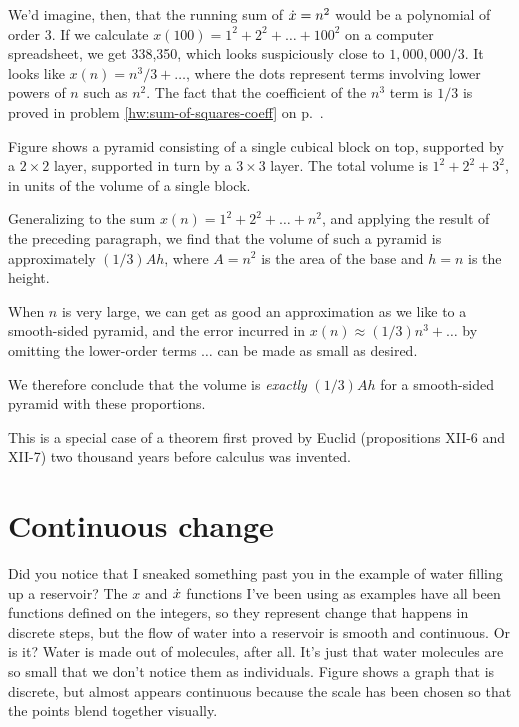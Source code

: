 We'd imagine, then, that the running sum of $\dot{x}=n^2$ would
be a polynomial of order 3. If we calculate
$x(100)=1^2+2^2+\ldots+100^2$ on a computer spreadsheet, we
get 338,350, which looks suspiciously close to $1,000,000/3$.
It looks like $x(n)=n^3/3+\ldots$, where
the dots represent terms involving lower powers of $n$
such as $n^2$. The fact that the coefficient of the $n^3$ term
is $1/3$ is proved in problem \ref{hw:sum-of-squares-coeff} on p.~\pageref{hw:sum-of-squares-coeff}.\label{claim-sum-of-squares-coeff}


\begin{eg}
Figure  shows a pyramid consisting of a single cubical block on top,
supported by a $2\times 2$ layer, supported in turn by a $3\times 3$ layer. The total
volume is $1^2+2^2+3^2$, in units of the volume of a single block. 

Generalizing to the sum $x(n)=1^2+2^2+\ldots+n^2$, and applying the result
of the preceding paragraph, we find that the volume of such a pyramid is approximately
$(1/3)Ah$, where $A=n^2$ is the area of the base and $h=n$ is the height.

When $n$ is very large, we can get as good an approximation as we like to
a smooth-sided pyramid, and the error incurred in $x(n)\approx (1/3)n^3+\ldots$ by omitting the lower-order
terms $\ldots$ can be made as small as desired.

We therefore conclude that the volume is \emph{exactly} $(1/3)Ah$ for a smooth-sided
pyramid with these proportions.

This is a special case of a theorem first proved by Euclid (propositions 
XII-6 and XII-7) two thousand years before calculus was invented.
\end{eg}

\section{Continuous change}

%
Did you notice that I sneaked something past you in the example
of water filling up a reservoir? The $x$ and $\dot{x}$ functions I've
been using as examples have all been functions defined on the integers,
so they represent change that happens in discrete steps, but the flow
of water into a reservoir is smooth and continuous. Or is it? Water is
made out of molecules, after all. It's just that water molecules are so small that
we don't notice them as individuals. Figure  shows
a graph that is discrete, but almost appears continuous because the scale has
been chosen so that the points blend together visually.

